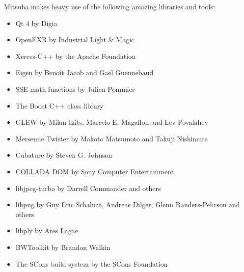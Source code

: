 Mitsuba makes heavy use of the following amazing libraries and tools: 
\begin{itemize}
\item Qt 4 by Digia
\item OpenEXR by Industrial Light \& Magic
\item Xerces-C+\!+ by the Apache Foundation
\item Eigen by Beno\^it Jacob and Ga\"el Guennebaud
\item SSE math functions by Julien Pommier
\item The Boost C+\!+ class library
\item GLEW by Milan Ikits, Marcelo E. Magallon and Lev Povalahev
\item Mersenne Twister by Makoto Matsumoto and Takuji Nishimura
\item Cubature by Steven G. Johnson
\item COLLADA DOM by Sony Computer Entertainment
\item libjpeg-turbo by Darrell Commander and others
\item libpng by Guy Eric Schalnat, Andreas Dilger, Glenn Randers-Pehrson and \mbox{others}
\item libply by Ares Lagae
\item BWToolkit by Brandon Walkin
\item The SCons build system by the SCons Foundation
\end{itemize}
